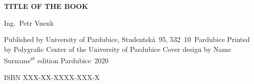 \documentclass[11pt,b5paper,twoside]{report}										%
\begin{document}
\vspace*{14.5 cm}
\renewcommand{\baselinestretch}{1.242}\selectfont									%
\textbf{{\large TITLE OF THE BOOK}}										%
\thispagestyle{empty}																%
\renewcommand{\baselinestretch}{1}\selectfont										%

Ing.~Petr Vnenk															%

\vspace{0.5 cm}
Published by University of Pardubice, Studentská~95, 532~10~Pardubice\newline
Printed by Polygrafic Center of the University of Pardubice\newline
Cover design by Name Surname\textsuperscript{st} edition\newline
Pardubice~2020															%
\vspace{0.5 cm}

ISBN XXX-XX-XXXX-XXX-X													%
\end{document}
